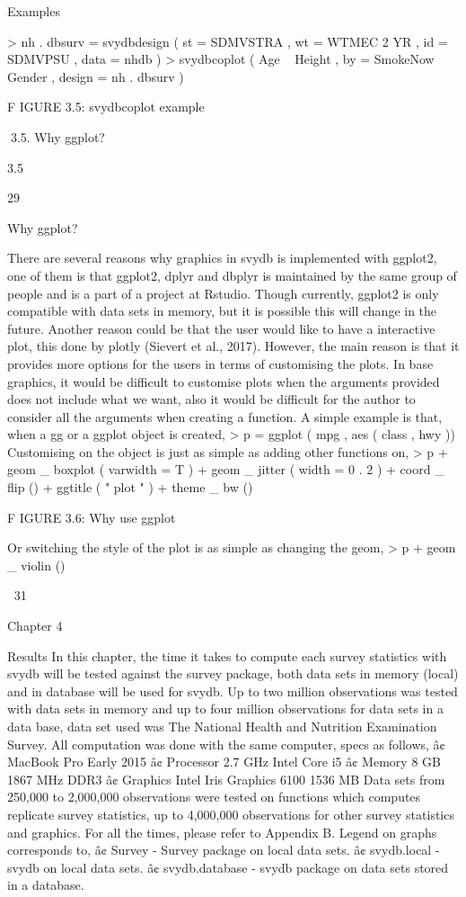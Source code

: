 Examples

> nh . dbsurv = svydbdesign ( st = SDMVSTRA , wt = WTMEC 2 YR ,
id = SDMVPSU , data = nhdb )
> svydbcoplot ( Age ~ Height , by = SmokeNow ~ Gender ,
design = nh . dbsurv )

F IGURE 3.5: svydbcoplot example

3.5. Why ggplot?

3.5

29

Why ggplot?

There are several reasons why graphics in svydb is implemented with ggplot2, one
of them is that ggplot2, dplyr and dbplyr is maintained by the same group of people
and is a part of a project at Rstudio. Though currently, ggplot2 is only compatible
with data sets in memory, but it is possible this will change in the future. Another
reason could be that the user would like to have a interactive plot, this done by
plotly (Sievert et al., 2017).
However, the main reason is that it provides more options for the users in terms
of customising the plots. In base graphics, it would be difficult to customise plots
when the arguments provided does not include what we want, also it would be difficult for the author to consider all the arguments when creating a function.
A simple example is that, when a gg or a ggplot object is created,
> p = ggplot ( mpg , aes ( class , hwy ))
Customising on the object is just as simple as adding other functions on,
> p + geom _ boxplot ( varwidth = T ) +
geom _ jitter ( width = 0 . 2 ) + coord _ flip () +
ggtitle ( " plot " ) + theme _ bw ()

F IGURE 3.6: Why use ggplot

Or switching the style of the plot is as simple as changing the geom,
> p + geom _ violin ()

31

Chapter 4

Results
In this chapter, the time it takes to compute each survey statistics with svydb will be
tested against the survey package, both data sets in memory (local) and in database
will be used for svydb. Up to two million observations was tested with data sets
in memory and up to four million observations for data sets in a data base, data set
used was The National Health and Nutrition Examination Survey.
All computation was done with the same computer, specs as follows,
â¢ MacBook Pro Early 2015
â¢ Processor 2.7 GHz Intel Core i5
â¢ Memory 8 GB 1867 MHz DDR3
â¢ Graphics Intel Iris Graphics 6100 1536 MB
Data sets from 250,000 to 2,000,000 observations were tested on functions which
computes replicate survey statistics, up to 4,000,000 observations for other survey
statistics and graphics. For all the times, please refer to Appendix B.
Legend on graphs corresponds to,
â¢ Survey - Survey package on local data sets.
â¢ svydb.local - svydb on local data sets.
â¢ svydb.database - svydb package on data sets stored in a database.

